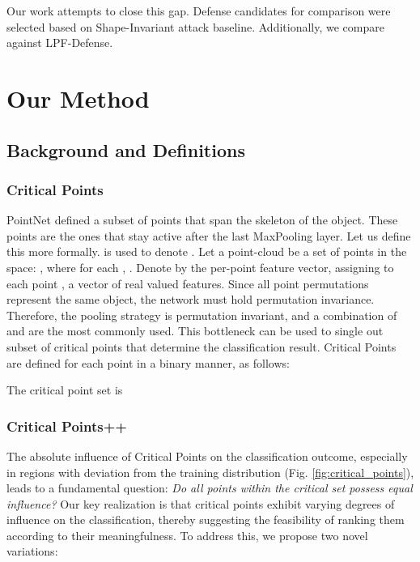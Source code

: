 \documentclass[10pt,twocolumn,letterpaper]{article}
\begin{document}
Our work attempts to close this gap. Defense candidates for comparison were selected based on Shape-Invariant attack\cite{shape_invariant} baseline. Additionally, we compare against LPF-Defense\cite{lpf_defense}.









\section{Our Method}
\subsection{Background and Definitions}
\subsubsection{Critical Points}
PointNet\cite{pointnet} defined a subset of points that span the skeleton of the object. These points are the ones that stay active after the last MaxPooling layer. Let us define this more formally.
 is used to denote .
Let a point-cloud be a set of  points in the  space: , where for each , .
Denote by  the per-point feature vector, assigning to each point , a vector  of  real valued features.
Since all point permutations represent the same object, the network must hold permutation invariance. Therefore, the pooling strategy is permutation invariant, and a combination of  and  are the most commonly used. This bottleneck can be used to single out subset of critical points that determine the classification result. Critical Points are defined for each point  in a binary manner, as follows:

The critical point set is 

\subsubsection{Critical Points++}
The absolute influence of Critical Points on the classification outcome, especially in regions with deviation from the training distribution (Fig. \ref{fig:critical_points}), leads to a fundamental question: \textit{Do all points within the critical set possess equal influence?} Our key realization is that critical points exhibit varying degrees of influence on the classification, thereby suggesting the feasibility of ranking them according to their meaningfulness. To address this, we propose two novel variations:
\end{document}
